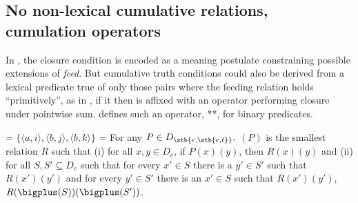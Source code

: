 \documentclass[output=paper]{langscibook}
\begin{document}
\subsection{No non-lexical cumulative relations, cumulation operators}\label{has-sch:sec:2.2}

In , the closure condition is encoded as a meaning postulate constraining possible extensions of \textit{feed}. But cumulative truth conditions could also be derived from a lexical predicate true of only those pairs where the feeding relation holds ``primitively'', as in , if it then is affixed with an operator performing closure under pointwise sum.  defines such an operator, **, for binary predicates. 


\ea
\ea \label{has-sch:2a}  = $\{\langle a, i\rangle, \langle b, j\rangle, \langle b, k\rangle\}$ \hfill {} = 
\ex \label{has-sch:2b} For any $P \in  D_{\stb{e, \stb{e, t}}},$ \sib{**}$(P)$ is the smallest relation $R$ such that (i) for all $x, y \in D_{e}$, if $P(x)(y)$, then $R(x)(y)$  and (ii) for all $S, S' \subseteq D_{e}$ such that for every $x' \in S$ there is a $y' \in S'$ such that $R(x')(y')$ and for every $y' \in S'$ there is an $x' \in S$ such that $R(x')(y') $, $R(\bigplus(S))(\bigplus(S'))$.
\z\z\largerpage
\end{document}
